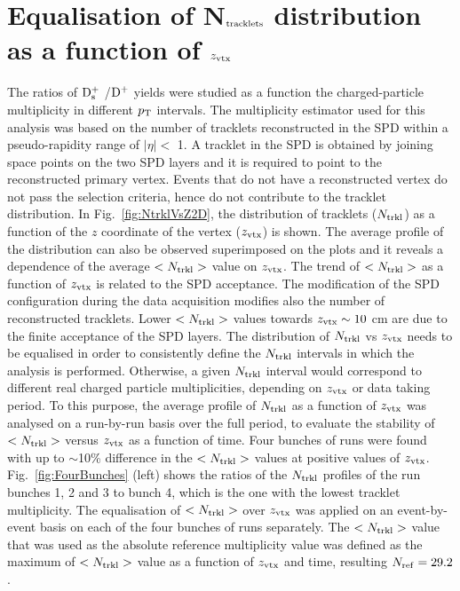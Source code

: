 \section{Equalisation of N$_{\rm tracklets}$ distribution as a function of $z_{\rm vtx}$}
\label{sec:zVxtEq}
The ratios of ${\rm D_s^+}$ /${\rm D^+}$ yields were studied as a 
function the charged-particle multiplicity in different $p_{\rm T}$ intervals.
The multiplicity estimator used for this analysis was based on the number 
of tracklets reconstructed in the SPD within a 
pseudo-rapidity range of $|\eta| <$ 1. A tracklet in the SPD is obtained by
joining space points on the two SPD layers and it is required to point to 
the reconstructed primary vertex. 
Events that do not have a reconstructed vertex do not pass the selection criteria, hence
do not contribute to the tracklet distribution. 
In Fig.~\ref{fig:NtrklVsZ2D}, the distribution of tracklets ($N_{\rm trkl}$) as a function
of the $z$ coordinate of the vertex ($z_{\rm vtx}$) is shown.
 The average profile of the distribution can also be observed superimposed on the plots
 and it reveals a dependence of the average $<N_{\rm trkl}>$ value on $z_{\rm vtx}$. 
 The trend of $<N_{\rm trkl}>$ as a function of $z_{\rm vtx}$ is related to the SPD acceptance.
 The modification of the SPD configuration during the data acquisition 
 modifies also the number of reconstructed tracklets.
 Lower $<N_{\rm trkl}>$ values towards $z_{\rm vtx} \sim 10 $ cm are due to the 
 finite acceptance of the SPD layers. 
The distribution of $N_{\rm trkl}$ vs $z_{\rm vtx}$ needs to be equalised 
in order to consistently define the $N_{\rm trkl}$ intervals in which the analysis is performed.
Otherwise, a given $N_{\rm trkl}$ interval would correspond to different real charged particle
multiplicities, depending on $z_{\rm vtx}$ or data taking period.
To this purpose, the average profile of $N_{\rm trkl}$ as a function of $z_{\rm vtx}$ was analysed on a run-by-run basis 
over the full period, to evaluate the stability of $<N_{\rm trkl}>$ versus $z_{\rm vtx}$ 
as a function of time. Four bunches of runs were found with 
up to $\sim$10\% difference in the $<N_{\rm trkl}>$ values at positive values 
of $z_{\rm vtx}$. Fig.~\ref{fig:FourBunches} (left) shows the ratios of the $N_{\rm trkl}$ profiles
of the run bunches 1, 2 and 3 to bunch 4, which is the one with the lowest tracklet multiplicity.
 The equalisation of $<N_{\rm trkl}>$ over $z_{\rm vtx}$ was applied on an 
 event-by-event basis on each of the four bunches of runs separately.
The $<N_{\rm trkl}>$ value that was used as the absolute reference multiplicity 
value was defined as the maximum of $<N_{\rm trkl}>$ value as a function of $z_{\rm vtx}$ and time,
resulting $N_{\rm ref} =  29.2$. 
